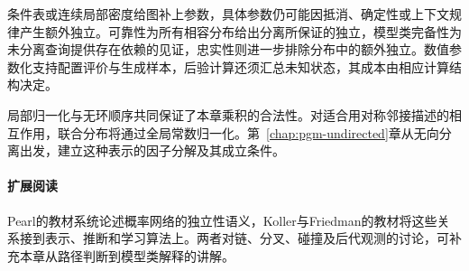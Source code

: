 条件表或连续局部密度给图补上参数，具体参数仍可能因抵消、确定性或上下文规律产生额外独立。可靠性为所有相容分布给出分离所保证的独立，模型类完备性为未分离查询提供存在依赖的见证，忠实性则进一步排除分布中的额外独立。数值参数化支持配置评价与生成样本，后验计算还须汇总未知状态，其成本由相应计算结构决定。

局部归一化与无环顺序共同保证了本章乘积的合法性。对适合用对称邻接描述的相互作用，联合分布将通过全局常数归一化。第~\ref{chap:pgm-undirected}章从无向分离出发，建立这种表示的因子分解及其成立条件。

\paragraph{扩展阅读}
Pearl的教材系统论述概率网络的独立性语义，Koller与Friedman的教材将这些关系接到表示、推断和学习算法上。两者对链、分叉、碰撞及后代观测的讨论，可补充本章从路径判断到模型类解释的讲解。
